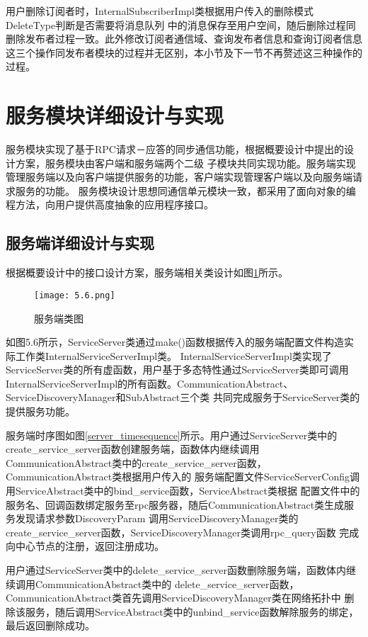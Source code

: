 用户删除订阅者时，InternalSubscriberImpl类根据用户传入的删除模式DeleteType判断是否需要将消息队列
中的消息保存至用户空间，随后删除过程同删除发布者过程一致。此外修改订阅者通信域、查询发布者信息和查询订阅者信息这三个操作同发布者模块的过程并无区别，本小节及下一节不再赘述这三种操作的过程。

\section{服务模块详细设计与实现}
服务模块实现了基于RPC请求－应答的同步通信功能，根据概要设计中提出的设计方案，服务模块由客户端和服务端两个二级
子模块共同实现功能。服务端实现管理服务端以及向客户端提供服务的功能，客户端实现管理客户端以及向服务端请求服务的功能。
服务模块设计思想同通信单元模块一致，都采用了面向对象的编程方法，向用户提供高度抽象的应用程序接口。
\subsection{服务端详细设计与实现}
根据概要设计中的接口设计方案，服务端相关类设计如图\ref{server_class}所示。
\begin{figure}[htb]
  \centering
  \texttt{[image: 5.6.png]}
  \caption{服务端类图}
  \label{server_class}
\end{figure}

如图5.6所示，ServiceServer类通过make()函数根据传入的服务端配置文件构造实际工作类InternalServiceServerImpl类。
InternalServiceServerImpl类实现了ServiceServer类的所有虚函数，用户基于多态特性通过ServiceServer类即可调用
InternalServiceServerImpl的所有函数。CommunicationAbstract、ServiceDiscoveryManager和SubAbstract三个类
共同完成服务于ServiceServer类的提供服务功能。

服务端时序图如图\ref{server_timesequence}所示。用户通过ServiceServer类中的create\_service\_server函数创建服务端，函数体内继续调用
CommunicationAbstract类中的create\_service\_server函数，CommunicationAbstract类根据用户传入的
服务端配置文件ServiceServerConfig调用ServiceAbstract类中的bind\_service函数，ServiceAbstract类根据
配置文件中的服务名、回调函数绑定服务至rpc服务器，随后CommunicationAbstract类生成服务发现请求参数DiscoveryParam
调用ServiceDiscoveryManager类的create\_service\_server函数，ServiceDiscoveryManager类调用rpc\_query函数
完成向中心节点的注册，返回注册成功。

用户通过ServiceServer类中的delete\_service\_server函数删除服务端，函数体内继续调用CommunicationAbstract类中的
delete\_service\_server函数，CommunicationAbstract类首先调用ServiceDiscoveryManager类在网络拓扑中
删除该服务，随后调用ServiceAbstract类中的unbind\_service函数解除服务的绑定，最后返回删除成功。


